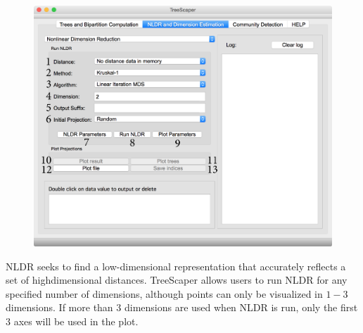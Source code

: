 \documentclass[11pt]{article}
\begin{document}
\begin{figure}[thbp!]\centering
\includegraphics[scale=0.4]{imagesForManual/Figure12_6_2_1.pdf}
\end{figure}

NLDR seeks to find a low-dimensional representation that accurately reflects a set of highdimensional distances. TreeScaper allows users to run NLDR for any specified number of
dimensions, although points can only be visualized in $1-3$ dimensions. If more than $3$
dimensions are used when NLDR is run, only the first $3$ axes will be used in the plot. \\


\\
\end{document}
